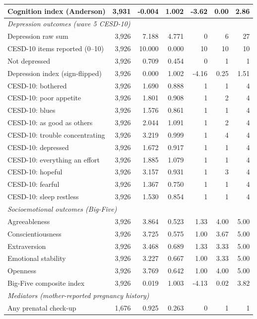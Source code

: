 \begin{longtable}{lrrrrrr}
Cognition index (Anderson) & 3,931 & -0.004 & 1.002 & -3.62 & 0.00 & 2.86 \\
\midrule
\multicolumn{7}{l}{\emph{Depression outcomes (wave 5 CESD-10)}} \\
Depression raw sum & 3,926 & 7.188 & 4.771 & 0 & 6 & 27 \\
CESD-10 items reported (0--10) & 3,926 & 10.000 & 0.000 & 10 & 10 & 10 \\
Not depressed & 3,926 & 0.709 & 0.454 & 0 & 1 & 1 \\
Depression index (sign-flipped) & 3,926 & 0.000 & 1.002 & -4.16 & 0.25 & 1.51 \\
CESD-10: bothered & 3,926 & 1.690 & 0.888 & 1 & 1 & 4 \\
CESD-10: poor appetite & 3,926 & 1.801 & 0.908 & 1 & 2 & 4 \\
CESD-10: blues & 3,926 & 1.576 & 0.861 & 1 & 1 & 4 \\
CESD-10: as good as others & 3,926 & 2.044 & 1.091 & 1 & 2 & 4 \\
CESD-10: trouble concentrating & 3,926 & 3.219 & 0.999 & 1 & 4 & 4 \\
CESD-10: depressed & 3,926 & 1.672 & 0.917 & 1 & 1 & 4 \\
CESD-10: everything an effort & 3,926 & 1.885 & 1.079 & 1 & 1 & 4 \\
CESD-10: hopeful & 3,926 & 3.157 & 0.931 & 1 & 3 & 4 \\
CESD-10: fearful & 3,926 & 1.367 & 0.750 & 1 & 1 & 4 \\
CESD-10: sleep restless & 3,926 & 1.530 & 0.854 & 1 & 1 & 4 \\
\midrule
\multicolumn{7}{l}{\emph{Socioemotional outcomes (Big-Five)}} \\
Agreeableness & 3,926 & 3.864 & 0.523 & 1.33 & 4.00 & 5.00 \\
Conscientiousness & 3,926 & 3.725 & 0.575 & 1.00 & 3.67 & 5.00 \\
Extraversion & 3,926 & 3.468 & 0.689 & 1.33 & 3.33 & 5.00 \\
Emotional stability & 3,926 & 3.227 & 0.667 & 1.00 & 3.33 & 5.00 \\
Openness & 3,926 & 3.769 & 0.642 & 1.00 & 4.00 & 5.00 \\
Big-Five composite index & 3,926 & 0.019 & 1.003 & -4.13 & 0.02 & 3.82 \\
\midrule
\multicolumn{7}{l}{\emph{Mediators (mother-reported pregnancy history)}} \\
Any prenatal check-up & 1,676 & 0.925 & 0.263 & 0 & 1 & 1 \\

\end{longtable}
